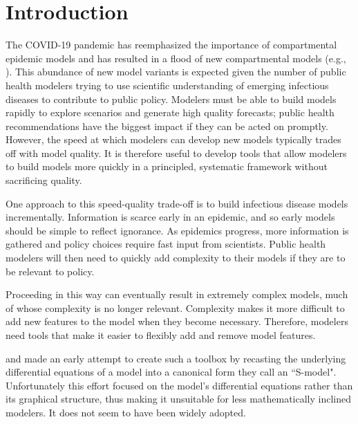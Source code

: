 \section{Introduction}\label{intro}
The COVID-19 pandemic has reemphasized the importance of compartmental epidemic models \citep{abou2020compartmental, massonis2021structural, adam2020special, currie2020simulation, lofgren2014mathematical, mcbryde2020role, enserink2020covid} and has resulted in a flood of new compartmental models (e.g., \cite{friston2020dynamic, fields2021age, chang2022stochastic, lavielle2020extension, balabdaoui2020age, leontitsis2021seahir, LeviEarn22}). 
This abundance of new model variants is expected given the number of public health modelers trying to use scientific understanding of emerging infectious diseases to contribute to public policy. Modelers must be able to build models rapidly to explore scenarios and generate high quality forecasts; public health recommendations have the biggest impact if they can be acted on promptly. However, the speed at which modelers can develop new models typically trades off with model quality. It is therefore useful to develop tools that allow modelers to build models more quickly in a principled, systematic framework without sacrificing quality. 

One approach to this speed-quality trade-off is to build infectious disease models incrementally. Information is scarce early in an epidemic, and so early models should be simple to reflect ignorance. As epidemics progress, more information is gathered and policy choices require fast input from scientists. Public health modelers will then need to quickly add complexity to their models if they are to be relevant to policy. 

Proceeding in this way can eventually result in extremely complex models, much of whose complexity is no longer relevant. Complexity makes it more difficult to add new features to the model when they become necessary. Therefore, modelers need tools that make it easier to flexibly add and remove model features. 

\cite{savageau1988introduction} and \cite{voit1988recasting, voit1990s} made an early attempt to create such a toolbox by recasting the underlying differential equations of a model into a canonical form they call an ``S-model". Unfortunately this effort focused on the model's differential equations rather than its graphical structure, thus making it unsuitable for less mathematically inclined modelers. It does not seem to have been widely adopted.

